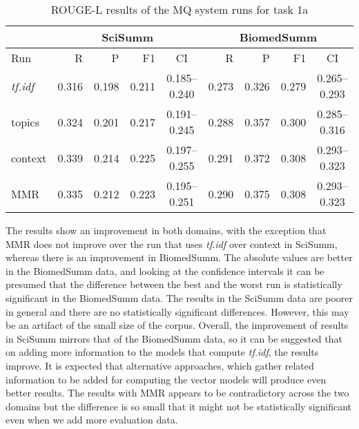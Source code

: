 \documentclass[11pt]{article}
\begin{document}
\begin{table*}
  \centering
  \begin{tabular}{|l|r|r|r|c|r|r|r|c|}
  	\hline
	& \multicolumn{4}{|c|}{SciSumm} & \multicolumn{4}{|c|}{BiomedSumm}\\
	\hline
	Run & R & P & F1 & CI & R & P & F1 & CI\\
	\hline
    \emph{tf.idf} & 0.316 & 0.198 & 0.211 & 0.185--0.240 & 0.273 &
    0.326 & 0.279 & 0.265--0.293\\
	topics & 0.324 & 0.201 & 0.217 & 0.191--0.245 & 0.288 & 0.357 & 0.300
	& 0.285--0.316\\
	context & 0.339 & 0.214 & 0.225 & 0.197--0.255 & 0.291 & 0.372 & 0.308
	& 0.293--0.323\\
	MMR & 0.335 & 0.212 & 0.223 & 0.195--0.251 &  0.290 & 0.375 & 0.308 & 0.293--0.323\\ 
	\hline
  \end{tabular}
  \caption{ROUGE-L results of the MQ system runs for task 1a}
  \label{tab:task1a}
\end{table*}

The results show an improvement in both domains, with the exception that MMR does not improve over the run that uses
\emph{tf.idf} over context in SciSumm, whereas there is an improvement in BiomedSumm. The absolute values are better in the BiomedSumm data, and looking at the confidence intervals it can be presumed that the difference between the best and the worst run is statistically significant in the BiomedSumm data. The results in the SciSumm data are poorer in general and there are no statistically significant differences. However, this may be an artifact of the small size of the corpus. Overall, the improvement of results in SciSumm mirrors that of the BiomedSumm data, so it can be suggested that on adding more information to the models that compute \emph{tf.idf}, the results improve. It is expected that alternative approaches, which gather related information to be added for computing the vector models will produce even better results. The results with MMR appears to be contradictory across the two domains but the difference is so small that it might not be statistically significant even when we add more evaluation data.
\end{document}
